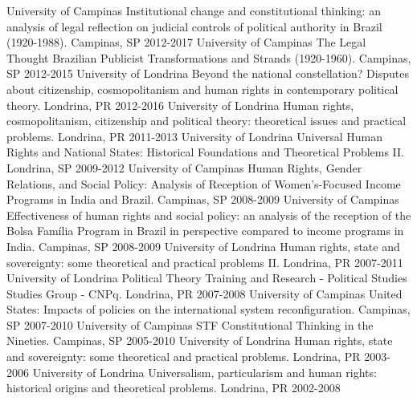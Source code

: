 \begin{cvhonors}
  \cvprohonor
    {University of Campinas}
    {Institutional change and constitutional thinking: an analysis of legal reflection on judicial controls of political authority in Brazil (1920-1988).}
    {Campinas, SP}
    {2012-2017}
  \cvprohonor
    {University of Campinas}
    {The Legal Thought Brazilian Publicist Transformations and Strands (1920-1960).}
    {Campinas, SP}
    {2012-2015}
  \cvprohonor
    {University of Londrina}
    {Beyond the national constellation? Disputes about citizenship, cosmopolitanism and human rights in contemporary political theory.}
    {Londrina, PR}
    {2012-2016}
  \cvprohonor
    {University of Londrina}
    {Human rights, cosmopolitanism, citizenship and political theory: theoretical issues and practical problems.}
    {Londrina, PR}
    {2011-2013}
  \cvprohonor
    {University of Londrina}
    {Universal Human Rights and National States: Historical Foundations and Theoretical Problems II.}
    {Londrina, SP}
    {2009-2012}
  \cvprohonor
    {University of Campinas}
    {Human Rights, Gender Relations, and Social Policy: Analysis of Reception of Women's-Focused Income Programs in India and Brazil.}
    {Campinas, SP}
    {2008-2009}
  \cvprohonor
    {University of Campinas}
    {Effectiveness of human rights and social policy: an analysis of the reception of the Bolsa Família Program in Brazil in perspective compared to income programs in India.}
    {Campinas, SP}
    {2008-2009}
  \cvprohonor
    {University of Londrina}
    {Human rights, state and sovereignty: some theoretical and practical problems II.}
    {Londrina, PR}
    {2007-2011}
  \cvprohonor
    {University of Londrina}
    {Political Theory Training and Research - Political Studies Studies Group - CNPq.}
    {Londrina, PR}
    {2007-2008}
  \cvprohonor
    {University of Campinas}
    {United States: Impacts of policies on the international system reconfiguration.}
    {Campinas, SP}
    {2007-2010}
  \cvprohonor
    {University of Campinas}
    {STF Constitutional Thinking in the Nineties.}
    {Campinas, SP}
    {2005-2010}
  \cvprohonor
    {University of Londrina}
    {Human rights, state and sovereignty: some theoretical and practical problems.}
    {Londrina, PR}
    {2003-2006}
  \cvprohonor
    {University of Londrina}
    {Universalism, particularism and human rights: historical origins and theoretical problems.}
    {Londrina, PR}
    {2002-2008}
\end{cvhonors}
